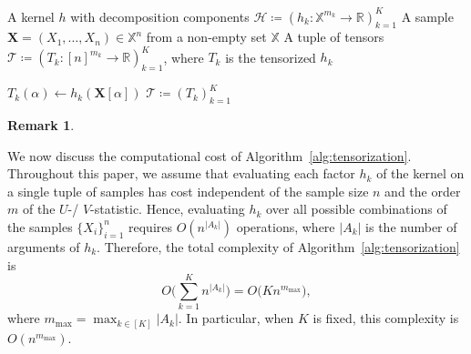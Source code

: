 \documentclass[sn-mathphys, natbib=false]{sn-jnl}
\theoremstyle{plain}
\theoremstyle{definition}
\newtheorem{remark}{Remark}
\newcommand{\samplespace}{\bbX}
\newif\ifshowchanges
\newcommand{\rev}[1]{%
  \ifshowchanges
    {\color{red} #1}%
  \else
    #1%
  \fi
}
\newcommand{\reals}{{\mathbb{R}}}
\def\bbX{\mathbb{X}}
\def\calT{\mathcal{T}}
\def\calH{\mathcal{H}}
\begin{document}
\begin{bibunit}[agsm]
\begin{algorithm}
    \caption{Tensorization of Kernel Function}
    \label{alg:tensorization}
    \begin{algorithmic}[1]
        \Require 
            \Statex A kernel $h$ with decomposition components $\calH \coloneqq (h_k: \bbX^{m_k} \to \reals)_{k=1}^K$
            \Statex A sample $\bm{X} = (X_1, \dots, X_n) \in \samplespace^n$ from a non-empty set $\samplespace$
        \Ensure A tuple of tensors $\calT \coloneqq (T_k: [n]^{m_k} \to \reals)_{k=1}^K$, where $T_k$ is the tensorized $h_k$

        \Function{Tensorization}{$\calH, \bm{X}$}
                    \State $T_k(\alpha) \gets h_k(\bm{X}[\alpha])$  
                \EndFor
            \EndFor
            \State \Return $\calT \coloneqq (T_k)_{k=1}^K$  
        \EndFunction
    \end{algorithmic}
\end{algorithm}



\begin{remark}\label{rem:complexity_tensorization}
\rev{
We now discuss the computational cost of Algorithm~\ref{alg:tensorization}. Throughout this paper, we assume that evaluating each factor $h_k$ of the kernel on a single tuple of samples has cost independent of the sample size $n$ and the order $m$ of the $U$-/ $V$-statistic. Hence, evaluating $h_k$ over all possible combinations of the samples $\{X_i\}_{i=1}^n$ requires $O(n^{|A_k|})$ operations, where $|A_k|$ is the number of arguments of $h_k$. 
Therefore, the total complexity of Algorithm~\ref{alg:tensorization} is
\begin{equation*}
    O\Bigg(\sum_{k=1}^K n^{|A_k|}\Bigg) 
    = O\Big(K n^{m_{\max}}\Big),
\end{equation*}
where $m_{\max} = \max_{k\in[K]} |A_k|$.
In particular, when $K$ is fixed, this complexity is $O(n^{m_{\max}})$.

}
\end{remark}
\end{bibunit}
\end{document}
